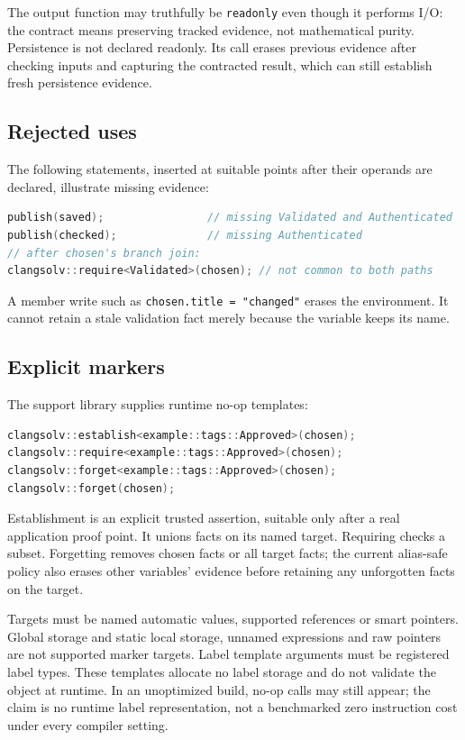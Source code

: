 \documentclass[11pt]{article}
\begin{document}
The output function may truthfully be \texttt{readonly} even though it performs
I/O: the contract means preserving tracked evidence, not mathematical purity.
Persistence is not declared readonly. Its call erases previous evidence
after checking inputs and capturing the contracted result, which can still
establish fresh persistence evidence.

\subsection{Rejected uses}
The following statements, inserted at suitable points after their operands
are declared, illustrate missing evidence:
\begin{lstlisting}[language=C++]
publish(saved);                // missing Validated and Authenticated
publish(checked);              // missing Authenticated
// after chosen's branch join:
clangsolv::require<Validated>(chosen); // not common to both paths
\end{lstlisting}
A member write such as \texttt{chosen.title = "changed"} erases the environment.
It cannot retain a stale validation fact merely because the variable keeps
its name.

\subsection{Explicit markers}
The support library supplies runtime no-op templates:
\begin{lstlisting}[language=C++]
clangsolv::establish<example::tags::Approved>(chosen);
clangsolv::require<example::tags::Approved>(chosen);
clangsolv::forget<example::tags::Approved>(chosen);
clangsolv::forget(chosen);
\end{lstlisting}
Establishment is an explicit trusted assertion, suitable only after a
real application proof point. It unions facts on its named target. Requiring
checks a subset. Forgetting removes chosen facts or all target facts; the
current alias-safe policy also erases other variables' evidence before
retaining any unforgotten facts on the target.

Targets must be named automatic values, supported references or smart
pointers. Global storage and static local storage, unnamed expressions and raw pointers
are not supported marker targets. Label template arguments must be registered
label types. These templates allocate no label storage and do not validate
the object at runtime. In an unoptimized build, no-op calls may still appear;
the claim is no runtime label representation, not a benchmarked zero instruction
cost under every compiler setting.
\end{document}
